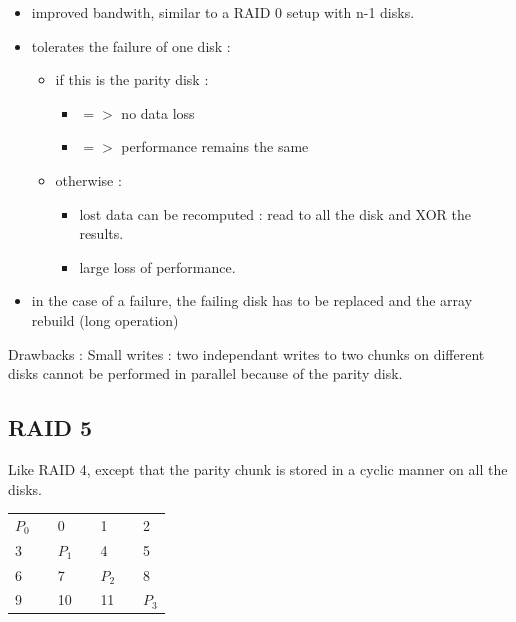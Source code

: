 \begin{itemize}
  \item improved bandwith, similar to a RAID 0 setup with n-1 disks.
  \item tolerates the failure of one disk :
  \begin{itemize}
    \item if this is the parity disk :
    \begin{itemize}
      \item $=>$ no data loss
      \item $=>$ performance remains the same
    \end{itemize}
    \item otherwise :
    \begin{itemize}
      \item lost data can be recomputed : read to all the disk and XOR the results.
      \item large loss of performance.
    \end{itemize}
  \end{itemize}
  \item in the case of a failure, the failing disk has to be replaced and the array rebuild (long operation)
\end{itemize}

Drawbacks :
Small writes : two independant writes to two chunks on different disks cannot be performed in parallel because of the parity disk.

\subsection{RAID 5}

Like RAID 4, except that the parity chunk is stored in a cyclic manner on all the disks.

\begin{figure}[h!]
  \begin{center}
    \caption{}
  \end{center}
\end{figure}

\begin{table}[h]
\begin{tabular}{|l|l|l|l|l|l|l|}
\cline{1-1} \cline{3-3} \cline{5-5} \cline{7-7}
$P_0$ &  & 0  &  & 1  &  & 2  \\ \cline{1-1} \cline{3-3} \cline{5-5} \cline{7-7} 
3  &  & $P_1$ &  & 4  &  & 5  \\ \cline{1-1} \cline{3-3} \cline{5-5} \cline{7-7} 
6  &  & 7  &  & $P_2$ &  & 8  \\ \cline{1-1} \cline{3-3} \cline{5-5} \cline{7-7} 
9  &  & 10 &  & 11 &  & $P_3$
\end{tabular}
\end{table}


